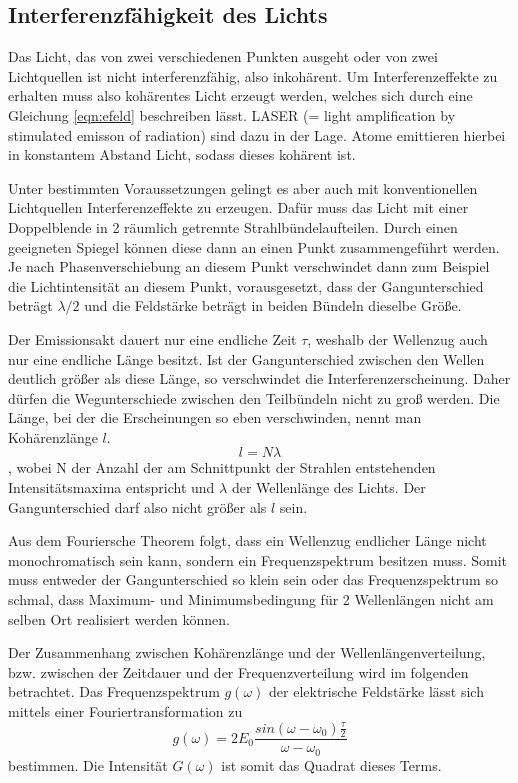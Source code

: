 \subsection{Interferenzfähigkeit des Lichts}

Das Licht, das von zwei verschiedenen Punkten ausgeht oder von zwei Lichtquellen ist nicht interferenzfähig, also inkohärent. Um Interferenzeffekte zu erhalten muss also kohärentes Licht erzeugt werden, welches sich durch eine Gleichung \ref{eqn:efeld} beschreiben lässt. LASER (= light amplification by stimulated emisson of radiation) sind dazu in der Lage. Atome emittieren hierbei in konstantem Abstand Licht, sodass dieses kohärent ist. 

Unter bestimmten Voraussetzungen gelingt es aber auch mit konventionellen Lichtquellen Interferenzeffekte zu erzeugen. Dafür muss das Licht mit einer Doppelblende in 2 räumlich getrennte Strahlbündelaufteilen. Durch einen geeigneten Spiegel können diese dann an einen Punkt zusammengeführt werden. Je nach Phasenverschiebung an diesem Punkt verschwindet dann zum Beispiel die Lichtintensität an diesem Punkt, vorausgesetzt, dass der Gangunterschied beträgt $\lambda/2$ und die Feldstärke beträgt in beiden Bündeln dieselbe Größe. 

Der Emissionsakt dauert nur eine endliche Zeit $\tau$, weshalb der Wellenzug auch nur eine endliche Länge besitzt. Ist der Gangunterschied zwischen den Wellen deutlich größer als diese Länge, so verschwindet die Interferenzerscheinung. Daher dürfen die Wegunterschiede zwischen den Teilbündeln nicht zu groß werden. Die Länge, bei der die Erscheinungen so eben verschwinden, nennt man Kohärenzlänge $l$. 
\begin{equation}
    l = N \lambda
\end{equation}
, wobei N der Anzahl der am Schnittpunkt der Strahlen entstehenden Intensitätsmaxima entspricht und $\lambda$ der Wellenlänge des Lichts. 
Der Gangunterschied darf also nicht größer als $l$ sein. 

Aus dem Fouriersche Theorem folgt, dass ein Wellenzug endlicher Länge nicht monochromatisch sein kann, sondern ein Frequenzspektrum besitzen muss. Somit muss entweder der Gangunterschied so klein sein oder das Frequenzspektrum so schmal, dass Maximum- und Minimumsbedingung für 2 Wellenlängen nicht am selben Ort realisiert werden können. 

Der Zusammenhang zwischen Kohärenzlänge und der Wellenlängenverteilung, bzw. zwischen der Zeitdauer und der Frequenzverteilung wird im folgenden betrachtet. 
Das Frequenzspektrum $g(\omega)$ der elektrische Feldstärke lässt sich mittels einer Fouriertransformation zu 
\begin{equation}
    g(\omega) = 2 E_0 \frac{sin(\omega - \omega_0) \frac{\tau}{2}}{\omega- \omega_0}
\end{equation}
bestimmen. 
Die Intensität $G(\omega)$ ist somit das Quadrat dieses Terms. 

